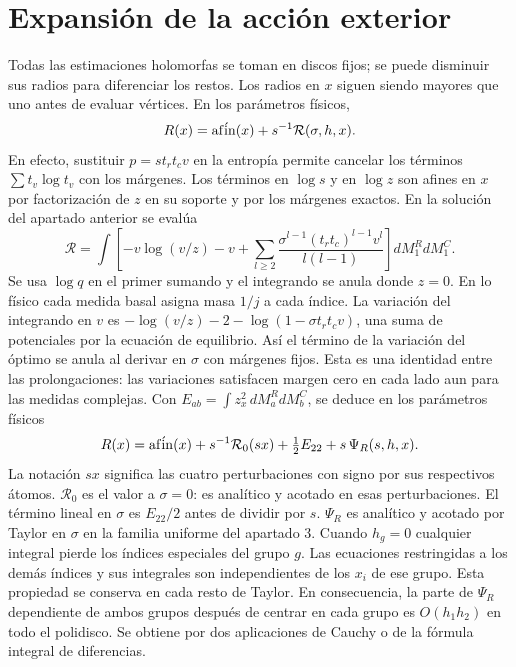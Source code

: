 \section{Expansión de la acción exterior}
Todas las estimaciones holomorfas se toman en discos fijos; se puede disminuir sus radios
para diferenciar los restos. Los radios en $x$ siguen siendo mayores que uno antes de
evaluar vértices. En los parámetros físicos,
\[
 R(x)={\rm af\acute in}(x)+s^{-1}\mathcal R(\sigma,h,x).
\]
En efecto, sustituir $p=s t_rt_c v$ en la entropía permite cancelar los términos
$\sum t_v\log t_v$ con los márgenes. Los términos en $\log s$ y en $\log z$
son afines en $x$ por factorización de $z$ en su soporte y por los márgenes exactos.
En la solución del apartado anterior se evalúa
\[
 \mathcal R=\int\!\left[-v\log(v/z)-v+
 \sum_{l\ge2}\frac{\sigma^{l-1}(t_rt_c)^{l-1}v^l}{l(l-1)}\right]dM_1^R dM_1^C.
\]
Se usa $\log q$ en el primer sumando y el integrando se anula donde $z=0$.
En lo físico cada medida basal asigna masa $1/j$ a cada índice.
La variación del integrando en $v$ es
$-\log(v/z)-2-\log(1-\sigma t_rt_c v)$, una suma de potenciales por la ecuación
de equilibrio. Así el término de la variación del óptimo se anula al derivar en
$\sigma$ con márgenes fijos. Esta es una identidad entre las prolongaciones:
las variaciones satisfacen margen cero en cada lado aun para las medidas complejas.
Con $E_{ab}=\int z_x^2\,dM_a^R dM_b^C$, se deduce en los parámetros físicos
\[
 R(x)={\rm af\acute in}(x)+s^{-1}\mathcal R_0(sx)+\tfrac12 E_{22}
                                  +s\,\Psi_R(s,h,x).
\]
La notación $sx$ significa las cuatro perturbaciones con signo por sus respectivos átomos.
$\mathcal R_0$ es el valor a $\sigma=0$: es analítico y acotado en esas perturbaciones.
El término lineal en $\sigma$ es $E_{22}/2$ antes de dividir por $s$.
$\Psi_R$ es analítico y acotado por Taylor en $\sigma$ en la familia uniforme del apartado 3.
Cuando $h_g=0$ cualquier integral pierde los índices especiales del grupo $g$.
Las ecuaciones restringidas a los demás índices y sus integrales son independientes de
los $x_i$ de ese grupo. Esta propiedad se conserva en cada resto de Taylor.
En consecuencia, la parte de $\Psi_R$ dependiente de ambos grupos después de centrar en
cada grupo es $O(h_1h_2)$ en todo el polidisco. Se obtiene por dos aplicaciones de Cauchy
o de la fórmula integral de diferencias.
